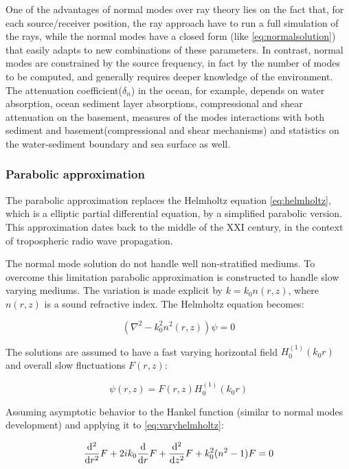 One of the advantages of normal modes over ray theory lies on the fact that, for
each source/receiver position, the ray approach have to run a full simulation of
the rays, while the normal modes have a closed form (like \ref{eq:normalsolution}) that easily adapts to new combinations of these
parameters. In contrast, normal modes are constrained by the source frequency,
in fact by the number of modes to be computed, and generally requires deeper
knowledge of the environment. The attenuation
coefficient($\delta_n$) in the ocean, for example, depends on water absorption,
ocean sediment layer absorptions, compressional and shear attenuation on the
basement, measures of the modes interactions with both sediment and
basement(compressional and shear mechanisms) and statistics on the
water-sediment boundary and sea surface as well.

\subsubsection{Parabolic approximation}

The parabolic approximation replaces the Helmholtz equation \ref{eq:helmholtz},
which is a elliptic partial differential equation, by a simplified parabolic
version. This approximation dates back to the middle of the $\mathrm{XXI}$
century, in the context of tropospheric radio wave propagation.

The normal mode solution do not handle well non-stratified mediums. To overcome
this limitation parabolic approximation is constructed to handle slow varying
mediums. The variation is made explicit by $k = k_0n(r,z)$, where $n(r,z)$ is a
sound refractive index\cite{LURTON}. The Helmholtz equation becomes:

\begin{equation}
\label{eq:varyhelmholtz}
(\nabla^2 - k_0^2n^2(r,z))\psi = 0 
\end{equation}

The solutions are assumed to have a fast varying horizontal field
$H_0^{(1)}(k_0r)$ and overall slow fluctuations $F(r,z)$:

\begin{equation*}
\psi(r,z) = F(r,z)H_0^{(1)}(k_0r)
\end{equation*}

Assuming asymptotic behavior to the Hankel function (similar to normal modes
development) and applying it to \ref{eq:varyhelmholtz}:

\begin{equation}
\label{eq:preparabolic}
\frac{\mathrm{d^{2}}}{\mathrm{d}{r}^{2}}F + 2ik_0\frac{\mathrm{d}}{\mathrm{d}r}F + \frac{\mathrm{d^{2}}}{\mathrm{d}{z}^{2}}F + k_0^2(n^2-1)F = 0
\end{equation}

